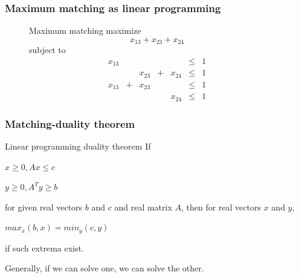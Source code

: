 \documentclass[hyperref={pdfpagelabels=false}]{beamer}
\begin{document}
\frame
{
	\frametitle{Maximum matching as linear programming}

	\begin{center}
	\end{center}
	
	\begin{center}
	\begin{figure}[h]
		\begin{block}{Maximum matching}
		maximize
		\begin{equation*}
		x_{13} + x_{23} + x_{24}
		\end{equation*}
		subject to
		\begin{equation*}
		\begin{array}{ccccccc}
	  	x_{13} &   &        &   &        & \leq & 1\\
		       &   & x_{23} & + & x_{24} & \leq & 1\\
		x_{13} & + & x_{23} &   &        & \leq & 1\\
		       &   &        &   & x_{24} & \leq & 1
	  	\end{array}
	  	\end{equation*}
		\end{block}
	\end{figure}
	\end{center}
}

\frame
{
	\frametitle{Matching-duality theorem}

	\begin{block}{Linear programming duality theorem}
		If
		
		\begin{center}
		$x \geq 0, Ax \leq c$ 
		
		$y \geq 0, A^{T}y \geq b$
		\end{center}
		
		for given real vectors $b$ and $c$ and real matrix $A$, then for real vectors $x$ and $y$,
		
		\begin{center}
		$max_{x}(b,x) = min_{y}(c, y)$
		\end{center}
		
		if such extrema exist.
	\end{block}
	
	Generally, if we can solve one, we can solve the other.
}
\end{document}
